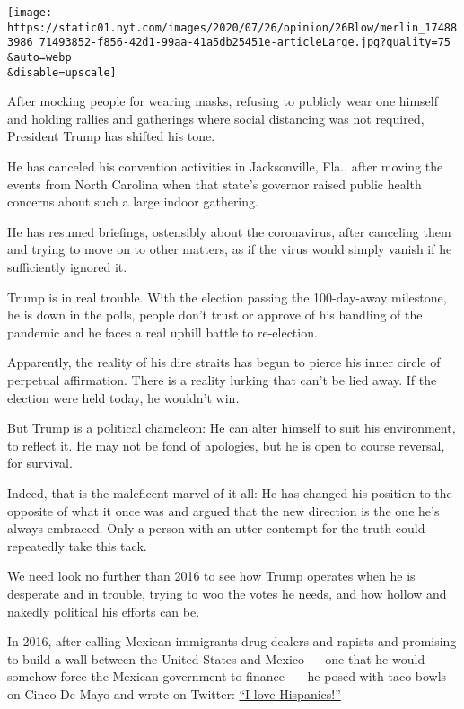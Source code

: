 \texttt{[image: https://static01.nyt.com/images/2020/07/26/opinion/26Blow/merlin\_174883986\_71493852-f856-42d1-99aa-41a5db25451e-articleLarge.jpg?quality=75\\\&auto=webp\\\&disable=upscale]}

After mocking people for wearing masks, refusing to publicly wear one
himself and holding rallies and gatherings where social distancing was
not required, President Trump has shifted his tone.

He has canceled his convention activities in Jacksonville, Fla., after
moving the events from North Carolina when that state's governor raised
public health concerns about such a large indoor gathering.

He has resumed briefings, ostensibly about the coronavirus, after
canceling them and trying to move on to other matters, as if the virus
would simply vanish if he sufficiently ignored it.

Trump is in real trouble. With the election passing the 100-day-away
milestone, he is down in the polls, people don't trust or approve of his
handling of the pandemic and he faces a real uphill battle to
re-election.

Apparently, the reality of his dire straits has begun to pierce his
inner circle of perpetual affirmation. There is a reality lurking that
can't be lied away. If the election were held today, he wouldn't win.

But Trump is a political chameleon: He can alter himself to suit his
environment, to reflect it. He may not be fond of apologies, but he is
open to course reversal, for survival.

Indeed, that is the maleficent marvel of it all: He has changed his
position to the opposite of what it once was and argued that the new
direction is the one he's always embraced. Only a person with an utter
contempt for the truth could repeatedly take this tack.

We need look no further than 2016 to see how Trump operates when he is
desperate and in trouble, trying to woo the votes he needs, and how
hollow and nakedly political his efforts can be.

In 2016, after calling Mexican immigrants drug dealers and rapists and
promising to build a wall between the United States and Mexico --- one
that he would somehow force the Mexican government to finance ---~he
posed with taco bowls on Cinco De Mayo and wrote on Twitter:
\href{https://www.cnn.com/2016/05/05/politics/donald-trump-taco-bowl-cinco-de-mayo/index.html}{``I
love Hispanics!''}

